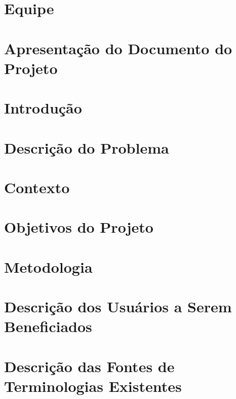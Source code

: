 \section{Equipe} %
\label{sec:introdu_o}
 

\section{Apresentação do Documento do Projeto} %
\label{sec:introdu_o}
 

\section{Introdução} %
\label{sec:introdu_o}
 

\section{Descrição do Problema} %
\label{sec:fundamentacao}
 

\section{Contexto} %
\label{sec:introdu_o}
 

\section{Objetivos do Projeto} %
\label{sec:introdu_o}
 

\section{Metodologia} %
\label{sec:metodologia}
 

\section{Descrição dos Usuários a Serem Beneficiados} %
\label{sec:introdu_o}
 

\section{Descrição das Fontes de Terminologias Existentes} %
\label{sec:terminologias}
 

